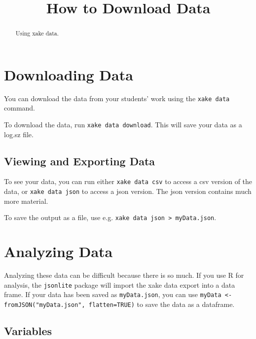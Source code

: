 \documentclass{ximera}
\title{How to Download Data}
\begin{document}
\begin{abstract}
  Using xake data.
\end{abstract}
\maketitle

\section{Downloading Data}

You can download the data from your students' work using the \verb!xake data! command.

To download the data, run \verb!xake data download!. This will save your data as a log.sz file.

\subsection{Viewing and Exporting Data}

To see your data, you can run either \verb!xake data csv! to access a csv version of the data, or \verb!xake data json! to access a json version. The json version contains much more material.

To save the output as a file, use e.g. \verb!xake data json > myData.json!.

\section{Analyzing Data}

Analyzing these data can be difficult because there is so much. If you use R for analysis, the \verb!jsonlite! package will import the xake data export into a data frame. If your data has been saved as \verb!myData.json!, you can use \verb!myData <- fromJSON("myData.json", flatten=TRUE)! to save the data as a dataframe.

\subsection{Variables}
\end{document}

